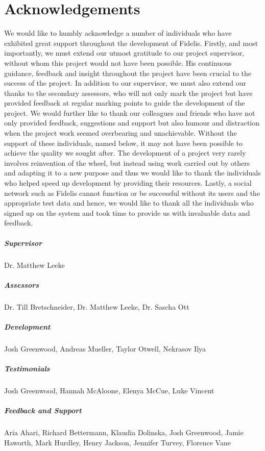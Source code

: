 \chapter*{Acknowledgements}

We would like to humbly acknowledge a number of individuals who have exhibited great support throughout the development of Fidelis. Firstly, and most importantly, we must extend our utmost gratitude to our project supervisor, without whom this project would not have been possible. His continuous guidance, feedback and insight throughout the project have been crucial to the success of the project. In addition to our supervisor, we must also extend our thanks to the secondary assessors, who will not only mark the project but have provided feedback at regular marking points to guide the development of the project.  We would further like to thank our colleagues and friends who have not only provided feedback, suggestions and support but also humour and distraction when the project work seemed overbearing and unachievable. Without the support of these individuals, named below, it may not have been possible to achieve the quality we sought after. The development of a project very rarely involves reinvention of the wheel, but instead using work carried out by others and adapting it to a new purpose and thus we would like to thank the individuals who helped speed up development by providing their resources. Lastly, a social network such as Fidelis cannot function or be successful without its users and the appropriate test data and hence, we would like to thank all the individuals who signed up on the system and took time to provide us with invaluable data and feedback.

\paragraph{Supervisor} Dr. Matthew Leeke

\paragraph{Assessors} Dr. Till Bretschneider, Dr. Matthew Leeke, Dr. Sascha Ott

\paragraph{Development} Josh Greenwood, Andreas Mueller, Taylor Otwell, Nekrasov Ilya

\paragraph{Testimonials} Josh Greenwood, Hannah McAloone, Elenya McCue, Luke Vincent

\paragraph{Feedback and Support} Aria Ahari, Richard Bettermann, Klaudia Dolinska, Josh Greenwood, Jamie Haworth, Mark Hurdley, Henry Jackson, Jennifer Turvey, Florence Vane